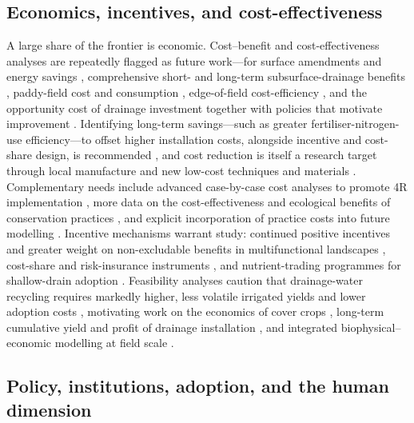 \documentclass[11pt]{article}
\begin{document}
\subsection{Economics, incentives, and cost-effectiveness}

A large share of the frontier is economic. Cost--benefit and cost-effectiveness
analyses are repeatedly flagged as future work---for surface amendments and
energy savings \parencite{Wamono2016b}, comprehensive short- and long-term
subsurface-drainage benefits \parencite{Guo2025}, paddy-field cost and
consumption \parencite{Jia2023}, edge-of-field cost-efficiency
\parencite{Mendes2020}, and the opportunity cost of drainage investment together
with policies that motivate improvement
\parencite{Wichelns2002,THOMAS1995,Kladivko2005,Saadat2017,Manik2019,Helmers2012}.
Identifying long-term savings---such as greater fertiliser-nitrogen-use
efficiency---to offset higher installation costs, alongside incentive and
cost-share design, is recommended \parencite{Castellano2019,Sunohara2015}, and
cost reduction is itself a research target through local manufacture and new
low-cost techniques and materials \parencite{Datta2002,Yannopoulos2020}.
Complementary needs include advanced case-by-case cost analyses to promote 4R
implementation \parencite{Liu2021}, more data on the cost-effectiveness and
ecological benefits of conservation practices \parencite{Yuan2022}, and explicit
incorporation of practice costs into future modelling \parencite{McLellan2015}.
Incentive mechanisms warrant study: continued positive incentives and greater
weight on non-excludable benefits in multifunctional landscapes
\parencite{Christianson2014}, cost-share and risk-insurance instruments
\parencite{Jaynes2012,Karlen2005}, and nutrient-trading programmes for
shallow-drain adoption \parencite{Ghane2021b}. Feasibility analyses caution that
drainage-water recycling requires markedly higher, less volatile irrigated
yields and lower adoption costs \parencite{Sellars2022}, motivating work on the
economics of cover crops \parencite{Waring2020}, long-term cumulative yield and
profit of drainage installation \parencite{Mourtzinis2021}, and integrated
biophysical--economic modelling at field scale \parencite{Ferin2023}.

\subsection{Policy, institutions, adoption, and the human dimension}
\end{document}
